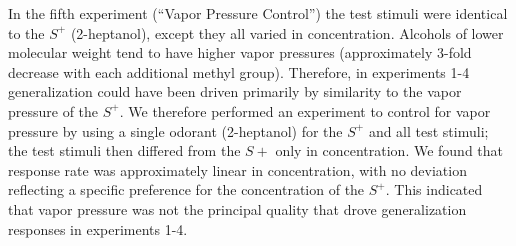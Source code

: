 In the fifth experiment (``Vapor Pressure Control'') the test stimuli were identical to the $S^+$ (2-heptanol), except they all varied in concentration.  
Alcohols of lower molecular weight tend to have higher vapor pressures (approximately 3-fold decrease with each additional methyl group).  
Therefore, in experiments 1-4 generalization could have been driven primarily by similarity to the vapor pressure of the $S^+$.  
We therefore performed an experiment to control for vapor pressure by using a single odorant (2-heptanol) for the $S^+$ and all test stimuli; the test stimuli then differed from the $S+$ only in concentration.  
We found that response rate was approximately linear in concentration, with no deviation reflecting a specific preference for the concentration of the $S^+$.  
This indicated that vapor pressure was not the principal quality that drove generalization responses in experiments 1-4.  